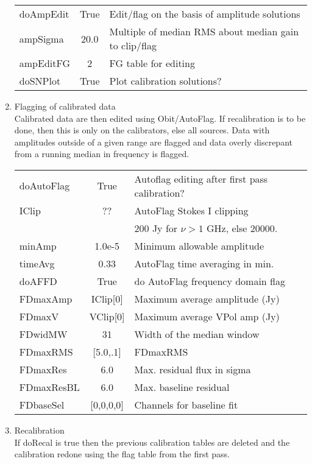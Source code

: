 \documentclass[11pt]{article}
\begin{document}
\begin{enumerate}
\begin{center}
\begin{tabular}{|l|c|l|}
doAmpEdit  & True  & Edit/flag on the basis of amplitude solutions \\
ampSigma  & 20.0 &  Multiple of median RMS about median gain to clip/flag\\
ampEditFG  & 2 &  FG table for editing \\
doSNPlot       & True &  Plot calibration solutions?\\
\hline
\end{tabular}
\end{center}
\newpage
%
\item Flagging of calibrated data\\
Calibrated data are then edited using Obit/AutoFlag. 
If recalibration is to be done, then this is only on the calibrators,
else all sources.
Data with amplitudes outside of a given range are flagged and data
overly discrepant from a running median in frequency is flagged.
\begin{center}
\begin{tabular}{|l|c|l|}
\hline
doAutoFlag  & True &  Autoflag editing after first pass calibration?\\
IClip  & ?? &  AutoFlag Stokes I clipping\\
 & & 200 Jy for $\nu> 1$ GHz, else 20000. \\
minAmp  & 1.0e-5 & Minimum allowable amplitude \\
timeAvg  & 0.33 &  AutoFlag time averaging in min.\\
doAFFD  & True & do AutoFlag frequency domain flag \\
FDmaxAmp  & IClip[0] &  Maximum average amplitude (Jy)\\
FDmaxV  & VClip[0] &  Maximum average VPol amp (Jy)\\
FDwidMW  & 31 & Width of the median window \\
FDmaxRMS  & [5.0,.1] &  FDmaxRMS\\
FDmaxRes  & 6.0  &  Max. residual flux in sigma\\
FDmaxResBL  & 6.0 &  Max. baseline residual\\
FDbaseSel  & [0,0,0,0] & Channels for baseline fit \\
\hline
\end{tabular}
\end{center}
%
\item Recalibration \\
If doRecal is true then the previous calibration tables are deleted
and the calibration redone using the flag table from the first pass.
\begin{enumerate}

\end{enumerate}
\end{enumerate}
\end{document}
